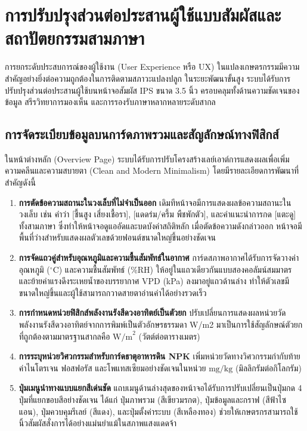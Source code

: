 \section{การปรับปรุงส่วนต่อประสานผู้ใช้แบบสัมผัสและสถาปัตยกรรมสามภาษา}

การยกระดับประสบการณ์ของผู้ใช้งาน (User Experience หรือ UX) ในแปลงเกษตรกรรมมีความสำคัญอย่างยิ่งต่อความถูกต้องในการติดตามสภาวะแปลงปลูก ในระยะพัฒนาขั้นสูง ระบบได้รับการปรับปรุงส่วนต่อประสานผู้ใช้บนหน้าจอสัมผัส IPS ขนาด 3.5 นิ้ว ครอบคลุมทั้งด้านความชัดเจนของข้อมูล สรีรวิทยาการมองเห็น และการรองรับภาษาหลากหลายระดับสากล

\subsection{การจัดระเบียบข้อมูลบนการ์ดภาพรวมและสัญลักษณ์ทางฟิสิกส์}

ในหน้าต่างหลัก (Overview Page) ระบบได้รับการปรับโครงสร้างเลย์เอาต์การแสดงผลเพื่อเพิ่มความคลีนและความสบายตา (Clean and Modern Minimalism) โดยมีรายละเอียดการพัฒนาที่สำคัญดังนี้
\begin{enumerate}
    \item \textbf{การตัดข้อความสถานะในวงเล็บที่ไม่จำเป็นออก} เดิมทีหน้าจอมีการแสดงผลข้อความสถานะในวงเล็บ เช่น คำว่า [ชื้นสูง เสี่ยงเชื้อรา], [แดดร่ม/ครึ้ม พืชพักตัว], และคำแนะนำการกด [แตะดู] ทั้งสามภาษา ซึ่งทำให้หน้าจอดูแออัดและบดบังค่าสถิติหลัก เมื่อตัดข้อความดังกล่าวออก หน้าจอมีพื้นที่ว่างสำหรับแสดงผลตัวเลขด้วยฟอนต์ขนาดใหญ่ขึ้นอย่างชัดเจน
    \item \textbf{การจัดแถวคู่สำหรับอุณหภูมิและความชื้นสัมพัทธ์ในอากาศ} การ์ดสภาพอากาศได้รับการจัดวางค่าอุณหภูมิ ($^\circ\text{C}$) และความชื้นสัมพัทธ์ (\%RH) ให้อยู่ในแถวเดียวกันแบบสองคอลัมน์สมมาตร และย้ายค่าแรงดึงระเหยน้ำของบรรยากาศ VPD (kPa) ลงมาอยู่แถวด้านล่าง ทำให้ตัวเลขมีขนาดใหญ่ขึ้นและผู้ใช้สามารถกวาดสายตาอ่านค่าได้อย่างรวดเร็ว
    \item \textbf{การกำหนดหน่วยฟิสิกส์พลังงานรังสีดวงอาทิตย์เป็นตัวยก} ปรับเปลี่ยนการแสดงผลหน่วยวัดพลังงานรังสีดวงอาทิตย์จากการพิมพ์เป็นตัวอักษรธรรมดา W/m2 มาเป็นการใช้สัญลักษณ์ตัวยกที่ถูกต้องตามมาตรฐานสากลคือ $\text{W/m}^2$ (วัตต์ต่อตารางเมตร)
    \item \textbf{การระบุหน่วยวิศวกรรมสำหรับการ์ดธาตุอาหารดิน NPK} เพิ่มหน่วยวัดทางวิศวกรรมกำกับท้ายค่าไนโตรเจน ฟอสฟอรัส และโพแทสเซียมอย่างชัดเจนในหน่วย $\text{mg/kg}$ (มิลลิกรัมต่อกิโลกรัม)
    \item \textbf{ปุ่มเมนูนำทางแบบแยกสีเด่นชัด} แถบเมนูด้านล่างสุดของหน้าจอได้รับการปรับเปลี่ยนเป็นปุ่มกด 4 ปุ่มที่แยกขอบสีอย่างชัดเจน ได้แก่ ปุ่มภาพรวม (สีเขียวมรกต), ปุ่มข้อมูลและกราฟ (สีฟ้าไซแอน), ปุ่มควบคุมรีเลย์ (สีแดง), และปุ่มตั้งค่าระบบ (สีเหลืองทอง) ช่วยให้เกษตรกรสามารถใช้นิ้วสัมผัสสั่งการได้อย่างแม่นยำแม้ในสภาพแสงแดดจ้า
\end{enumerate}


